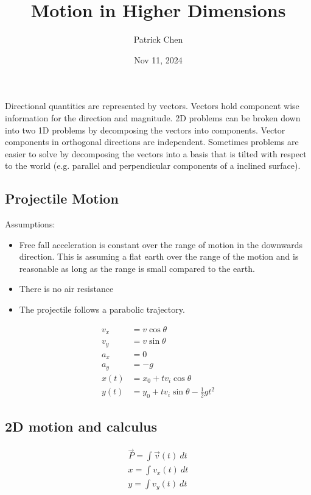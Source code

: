\documentclass{article}
\title{Motion in Higher Dimensions}
\author{Patrick Chen}
\date{Nov 11, 2024}
\theoremstyle{mytheoremstyle}
\theoremstyle{mytheoremstyle}
\theoremstyle{myproblemstyle}
\begin{document}
    \maketitle
    Directional quantities are represented by vectors. Vectors hold
    component wise information for the direction and magnitude. 2D problems can
    be broken down into two 1D problems by decomposing the vectors into
    components. Vector components in orthogonal directions are independent.
    Sometimes problems are easier to solve by decomposing the vectors into a
    basis that is tilted with respect to the world (e.g. parallel and
    perpendicular components of a inclined surface).

    \subsection*{Projectile Motion}
    Assumptions:
    \begin{itemize}
        \item Free fall acceleration is constant over the range of motion in the
            downwards direction. This is assuming a flat earth over the range of
            the motion and is reasonable as long as the range is small compared
            to the earth.
        \item There is no air resistance
        \item The projectile follows a parabolic trajectory.
    \end{itemize}

    \begin{align*}
        v_x &= v \cos\theta \\
        v_y &= v \sin\theta \\
        a_x &= 0 \\
        a_y &= -g \\
        x(t) &= x_0 + tv_i\cos\theta \\
        y(t) &= y_0 + tv_i\sin\theta- \frac{1}{2} gt^2
    \end{align*}

    \subsection*{2D motion and calculus}

    \begin{align*}
        \vec{P} = \int \vec{v}(t) \ dt \\
        x = \int v_x(t) \ dt \\
        y = \int v_y(t) \ dt
    \end{align*}
\end{document}
